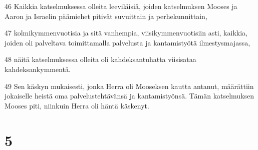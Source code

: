 \par 46 Kaikkia katselmuksessa olleita leeviläisiä, joiden katselmuksen Mooses ja Aaron ja Israelin päämiehet pitivät suvuittain ja perhekunnittain,
\par 47 kolmikymmenvuotisia ja sitä vanhempia, viisikymmenvuotisiin asti, kaikkia, joiden oli palveltava toimittamalla palvelusta ja kantamistyötä ilmestysmajassa,
\par 48 näitä katselmuksessa olleita oli kahdeksantuhatta viisisataa kahdeksankymmentä.
\par 49 Sen käskyn mukaisesti, jonka Herra oli Mooseksen kautta antanut, määrättiin jokaiselle heistä oma palvelustehtävänsä ja kantamistyönsä. Tämän katselmuksen Mooses piti, niinkuin Herra oli häntä käskenyt.

\chapter{5}

